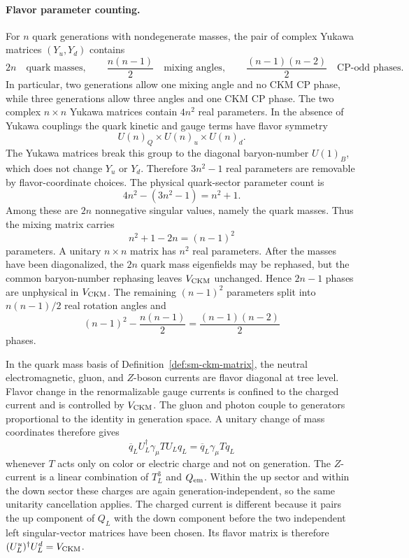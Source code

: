 \paragraph{Flavor parameter counting.}
For \(n\) quark generations with nondegenerate masses, the pair of complex
Yukawa matrices \((Y_u,Y_d)\) contains
\[
  2n \quad\text{quark masses},\qquad
  \frac{n(n-1)}{2}\quad\text{mixing angles},\qquad
  \frac{(n-1)(n-2)}{2}\quad\text{CP-odd phases}.
\]
In particular, two generations allow one mixing angle and no CKM CP phase,
while three generations allow three angles and one CKM CP phase.
The two complex \(n\times n\) Yukawa matrices contain \(4n^2\) real
parameters.  In the absence of Yukawa couplings the quark kinetic and gauge
terms have flavor symmetry
\[
  U(n)_Q\times U(n)_u\times U(n)_d .
\]
The Yukawa matrices break this group to the diagonal baryon-number
\(U(1)_B\), which does not change \(Y_u\) or \(Y_d\).  Therefore
\(3n^2-1\) real parameters are removable by flavor-coordinate choices.
The physical quark-sector parameter count is
\[
  4n^2-(3n^2-1)=n^2+1 .
\]
Among these are \(2n\) nonnegative singular values, namely the quark masses.
Thus the mixing matrix carries
\[
  n^2+1-2n=(n-1)^2
\]
parameters.  A unitary \(n\times n\) matrix has \(n^2\) real parameters.
After the masses have been diagonalized, the \(2n\) quark mass eigenfields
may be rephased, but the common baryon-number rephasing leaves
\(V_{\rm CKM}\) unchanged.  Hence \(2n-1\) phases are unphysical in \(V_{\rm
CKM}\).  The remaining \((n-1)^2\) parameters split into
\(n(n-1)/2\) real rotation angles and
\[
  (n-1)^2-\frac{n(n-1)}{2}=\frac{(n-1)(n-2)}{2}
\]
phases.

In the quark mass basis of Definition~\ref{def:sm-ckm-matrix}, the neutral
electromagnetic, gluon, and \(Z\)-boson currents are flavor diagonal at tree
level.  Flavor change in the renormalizable gauge currents is confined to the
charged current and is controlled by \(V_{\rm CKM}\).
The gluon and photon couple to generators proportional to the identity in
generation space.  A unitary change of mass coordinates therefore gives
\[
  \overline q_L U_L^\dagger\gamma_\mu T U_L q_L
  =
  \overline q_L\gamma_\mu T q_L
\]
whenever \(T\) acts only on color or electric charge and not on generation.
The \(Z\)-current is a linear combination of \(T_L^3\) and \(Q_{\rm em}\).
Within the up sector and within the down sector these charges are again
generation-independent, so the same unitarity cancellation applies.  The
charged current is different because it pairs the up component of \(Q_L\)
with the down component before the two independent left singular-vector
matrices have been chosen.  Its flavor matrix is therefore
\((U_L^u)^\dagger U_L^d=V_{\rm CKM}\).

